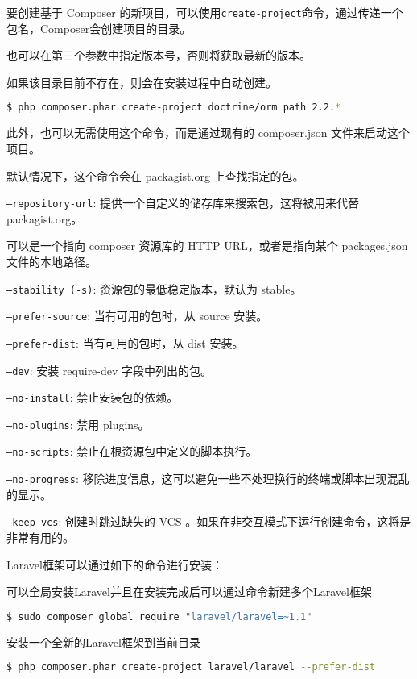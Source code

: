 要创建基于 Composer 的新项目，可以使用\texttt{create-project}命令，通过传递一个包名，Composer会创建项目的目录。

也可以在第三个参数中指定版本号，否则将获取最新的版本。


如果该目录目前不存在，则会在安装过程中自动创建。

\begin{lstlisting}[language=bash]
$ php composer.phar create-project doctrine/orm path 2.2.*
\end{lstlisting}



此外，也可以无需使用这个命令，而是通过现有的 composer.json 文件来启动这个项目。

默认情况下，这个命令会在 packagist.org 上查找指定的包。

\begin{compactitem}
\item \texttt{--repository-url}: 提供一个自定义的储存库来搜索包，这将被用来代替 packagist.org。

可以是一个指向 composer 资源库的 HTTP URL，或者是指向某个 packages.json 文件的本地路径。
\item \texttt{--stability (-s)}: 资源包的最低稳定版本，默认为 stable。
\item \texttt{--prefer-source}: 当有可用的包时，从 source 安装。
\item \texttt{--prefer-dist}: 当有可用的包时，从 dist 安装。
\item \texttt{--dev}: 安装 require-dev 字段中列出的包。
\item \texttt{--no-install}: 禁止安装包的依赖。
\item \texttt{--no-plugins}: 禁用 plugins。
\item \texttt{--no-scripts}: 禁止在根资源包中定义的脚本执行。
\item \texttt{--no-progress}: 移除进度信息，这可以避免一些不处理换行的终端或脚本出现混乱的显示。
\item \texttt{--keep-vcs}: 创建时跳过缺失的 VCS 。如果在非交互模式下运行创建命令，这将是非常有用的。
\end{compactitem}

Laravel框架可以通过如下的命令进行安装：

\begin{compactitem}
\item 可以全局安装Laravel并且在安装完成后可以通过命令新建多个Laravel框架


\begin{lstlisting}[language=bash]
$ sudo composer global require "laravel/laravel=~1.1"
\end{lstlisting}

\item 安装一个全新的Laravel框架到当前目录

\begin{lstlisting}[language=bash]
$ php composer.phar create-project laravel/laravel --prefer-dist
\end{lstlisting}

\end{compactitem}



